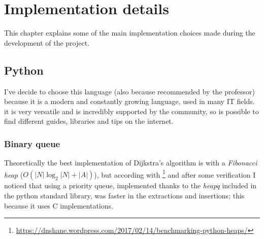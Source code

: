 \documentclass[a4paper,11pt]{report}
\begin{document}
\chapter{Implementation details}
This chapter explains some of the main implementation choices made during the development of the project.
\section{Python}
I've decide to choose this language (also because recommended by the professor) because it is a modern and constantly growing language, used in many IT fields. it is very versatile and is incredibly supported by the community, so is possible to find different guides, libraries and tips on the internet.
\subsection{Binary queue}
Theoretically the best implementation of Dijkstra's algorithm is with a \textit{Fibonacci heap} ($O(|N|\log_2|N|+|A|)$), but according with \footnote{\url{https://dnshane.wordpress.com/2017/02/14/benchmarking-python-heaps/}} and after some verification I noticed that using a priority queue, implemented thanks to the \textit{heapq} included in the python standard library, was faster in the extractions and insertions; this because it uses C implementations.
\end{document}
